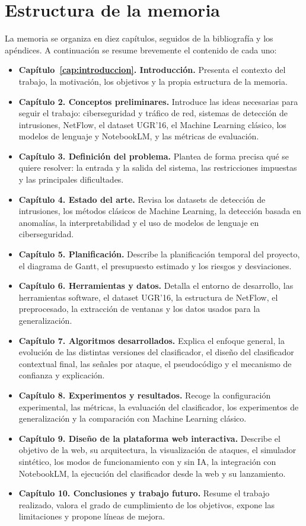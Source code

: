 \section{Estructura de la memoria}
\label{sec:intro_estructura}

La memoria se organiza en diez capítulos, seguidos de la bibliografía y los apéndices. A continuación se resume brevemente el contenido de cada uno:

\begin{itemize}
  \item \textbf{Capítulo~\ref{cap:introduccion}. Introducción.} Presenta el contexto del trabajo, la motivación, los objetivos y la propia estructura de la memoria.
  \item \textbf{Capítulo 2. Conceptos preliminares.} Introduce las ideas necesarias para seguir el trabajo: ciberseguridad y tráfico de red, sistemas de detección de intrusiones, NetFlow, el dataset UGR'16, el Machine Learning clásico, los modelos de lenguaje y NotebookLM, y las métricas de evaluación.
  \item \textbf{Capítulo 3. Definición del problema.} Plantea de forma precisa qué se quiere resolver: la entrada y la salida del sistema, las restricciones impuestas y las principales dificultades.
  \item \textbf{Capítulo 4. Estado del arte.} Revisa los datasets de detección de intrusiones, los métodos clásicos de Machine Learning, la detección basada en anomalías, la interpretabilidad y el uso de modelos de lenguaje en ciberseguridad.
  \item \textbf{Capítulo 5. Planificación.} Describe la planificación temporal del proyecto, el diagrama de Gantt, el presupuesto estimado y los riesgos y desviaciones.
  \item \textbf{Capítulo 6. Herramientas y datos.} Detalla el entorno de desarrollo, las herramientas software, el dataset UGR'16, la estructura de NetFlow, el preprocesado, la extracción de ventanas y los datos usados para la generalización.
  \item \textbf{Capítulo 7. Algoritmos desarrollados.} Explica el enfoque general, la evolución de las distintas versiones del clasificador, el diseño del clasificador contextual final, las señales por ataque, el pseudocódigo y el mecanismo de confianza y explicación.
  \item \textbf{Capítulo 8. Experimentos y resultados.} Recoge la configuración experimental, las métricas, la evaluación del clasificador, los experimentos de generalización y la comparación con Machine Learning clásico.
  \item \textbf{Capítulo 9. Diseño de la plataforma web interactiva.} Describe el objetivo de la web, su arquitectura, la visualización de ataques, el simulador sintético, los modos de funcionamiento con y sin IA, la integración con NotebookLM, la ejecución del clasificador desde la web y su lanzamiento.
  \item \textbf{Capítulo 10. Conclusiones y trabajo futuro.} Resume el trabajo realizado, valora el grado de cumplimiento de los objetivos, expone las limitaciones y propone líneas de mejora.
\end{itemize}

